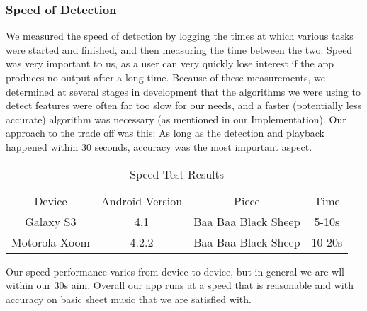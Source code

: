         \subsubsection{Speed of Detection}
        We measured the speed of detection by logging the times at which various tasks were started and finished, and then measuring the time between the two. Speed was very important to us, as a user can very quickly lose interest if the app produces no output after a long time. Because of these measurements, we determined at several stages in development that the algorithms we were using to detect features were often far too slow for our needs, and a faster (potentially less
        accurate) algorithm was necessary (as mentioned in our Implementation). Our approach to the trade off was this: As long as the detection and playback happened within 30 seconds, accuracy was the most important aspect. 
            \begin{table}[h!]
                \centering
                \begin{tabular}{ c | c | c | c }
                    Device & Android Version & Piece & Time \\
                    Galaxy S3 & 4.1 & Baa Baa Black Sheep & 5-10s \\
                    Motorola Xoom & 4.2.2 & Baa Baa Black Sheep & 10-20s
                \end{tabular}
                \caption{Speed Test Results}
                \label{table:speedtestresults}
            \end{table}
            Our speed performance varies from device to device, but in general we are wll within our 30s aim.
    Overall our app runs at a speed that is reasonable and with accuracy on basic sheet music that we are satisfied with.
